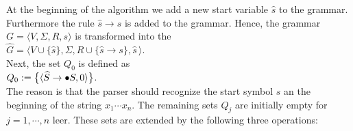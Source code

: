 At the beginning of the algorithm we add a new start variable  $\widehat{s}$ to the grammar.  Furthermore the
rule $\widehat{s} \rightarrow s$ is added to the grammar.  Hence, the grammar $G = \langle V, \Sigma, R, s \rangle$
is transformed into the  
\\[0.2cm]
\hspace*{1.3cm}
$\widehat{G} = \langle V \cup \{\widehat{s}\}, \Sigma, R \cup \{ \widehat{s} \rightarrow s \}, \widehat{s} \,\rangle$. 
\\[0.2cm]
Next, the set $Q_0$ is defined as
\\[0.2cm]
\hspace*{1.3cm}
$Q_0 := \bigl\{ \pair(\widehat{S} \rightarrow \bullet S, 0) \bigr\}$.
\\[0.2cm]
The reason is that the  parser should recognize the start symbol $s$ an the beginning of the string $x_1 \cdots
x_n$.
The remaining sets  $Q_j$ are initially empty for $j=1,\cdots,n$ leer.  These sets are extended by the
following three operations: 
